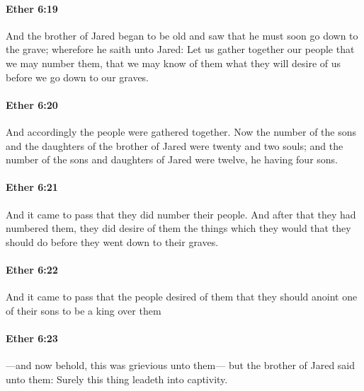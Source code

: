 		\paragraph{Ether 6:19} %
			\label{ETHER-6-19}

			And the brother of Jared began to be old
			and saw that he must soon go down to the grave;
			wherefore he saith unto Jared:
			Let us gather together our people that we may number them,
			that we may know of them what they will desire of us
			before we go down to our graves.

		\paragraph{Ether 6:20} %
			\label{ETHER-6-20}

			And accordingly the people were gathered together.
			Now the number of the sons and the daughters of the brother of Jared
			were twenty and two souls;
			and the number of the sons and daughters of Jared were twelve,
			he having four sons.

		\paragraph{Ether 6:21} %
			\label{ETHER-6-21}

			And it came to pass that they did number their people.
			And after that they had numbered them,
			they did desire of them the things
			which they would that they should do
			before they went down to their graves.

		\paragraph{Ether 6:22} %
			\label{ETHER-6-22}

			And it came to pass that the people desired of them
			that they should anoint one of their sons to be a king over them

		\paragraph{Ether 6:23} %
			\label{ETHER-6-23}

			---and now behold, this was grievious unto them---
			but the brother of Jared said unto them:
			Surely this thing leadeth into captivity.

